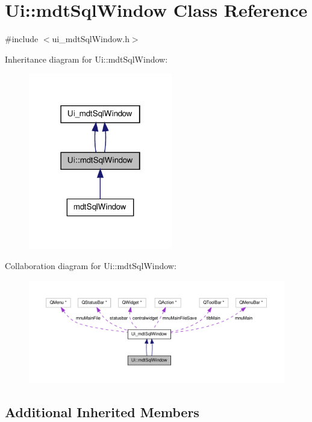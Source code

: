 \hypertarget{class_ui_1_1mdt_sql_window}{\section{Ui\-:\-:mdt\-Sql\-Window Class Reference}
\label{class_ui_1_1mdt_sql_window}
}


{\ttfamily \#include $<$ui\-\_\-mdt\-Sql\-Window.\-h$>$}



Inheritance diagram for Ui\-:\-:mdt\-Sql\-Window\-:
\nopagebreak
\begin{figure}[H]
\begin{center}
\leavevmode
\includegraphics[width=178pt]{class_ui_1_1mdt_sql_window__inherit__graph}
\end{center}
\end{figure}


Collaboration diagram for Ui\-:\-:mdt\-Sql\-Window\-:
\nopagebreak
\begin{figure}[H]
\begin{center}
\leavevmode
\includegraphics[width=350pt]{class_ui_1_1mdt_sql_window__coll__graph}
\end{center}
\end{figure}
\subsection*{Additional Inherited Members}


